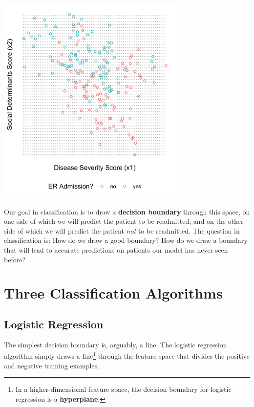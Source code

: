 \begin{center}
\includegraphics[width=0.7\textwidth]{img/esl-just-data.png}
\end{center}

Our goal in classification is to draw a \textbf{decision boundary} through this space, on one side of which we will predict the patient to be readmitted, and on the other side of which we will predict the patient \emph{not} to be readmitted. The question in classification is: How do we draw a good boundary? How do we draw a boundary that will lead to accurate predictions on patients our model has never seen before?


\section{Three Classification Algorithms}

\subsection{Logistic Regression}

The simplest decision boundary is, arguably, a line. The logistic regression algorithm simply draws a line\footnote{In a higher-dimensional feature space, the decision boundary for logistic regression is a \textbf{hyperplane}.} through the feature space that divides the positive and negative training examples. 

